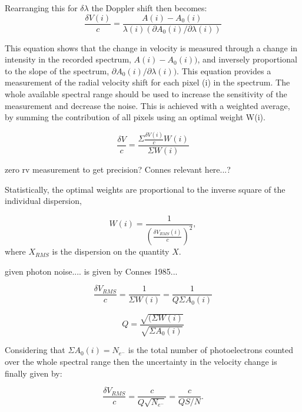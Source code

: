 Rearranging this for \(\delta \lambda\) the Doppler shift then becomes:
\begin{equation}
    \frac{\delta V(i)}{c} = \frac{A(i) - A_0(i) }{\lambda(i) (\partial A_0(i)/\partial \lambda(i))}
\end{equation}

This equation shows that the change in velocity is measured through a change in intensity in the recorded spectrum, \(A(i)-A_0(i))\), and inversely proportional to the slope of the spectrum, \(\partial A_0(i)/\partial \lambda(i))\). 
This equation provides a measurement of the radial velocity shift for each pixel (i) in the spectrum. The whole available spectral range should be used to increase the sensitivity of the measurement and decrease the noise. This is achieved with a weighted average, by summing the contribution of all pixels using an optimal weight W(i).


\begin{equation}
\frac{\delta V}{c} = \frac{\Sigma{ \frac{\delta V(i)}{c}W(i)}}{\Sigma {W(i)}}
\end{equation}

 zero rv measurement to get precision? Connes relevant here...?

Statistically, the optimal weights are proportional to the inverse square of the individual dispersion,

\begin{equation}
W(i) = \frac{1}{\left(\frac{\delta V_{RMS}(i)}{c}\right)^2},
\end{equation}
where $X_{RMS}$ is the dispersion on the quantity $X$.


given photon noise.... is given by Connes 1985... 


\begin{equation}
    \frac{\delta V_{RMS}}{c} = \frac{1}{\Sigma {W(i)}} = \frac{1}{Q \Sigma {A_0(i)}}
\end{equation}

\begin{equation}
Q = \frac{\sqrt{(\Sigma{W(i)}}}{\sqrt{\Sigma{A_0(i)}}}
\end{equation}

Considering that \(\Sigma{A_0(i)} = N_{e^-} \) is the total number of photoelectrons counted over the whole spectral range then the uncertainty in the velocity change is finally given by:

\begin{equation}
\frac{\delta V_{RMS}}{c} = \frac{c}{Q \sqrt{N_{e^-}}} = \frac{c}{Q S/N}.
\end{equation}

